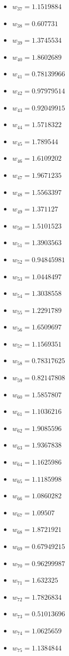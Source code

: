 \documentclass[11pt]{article}
\begin{document}
\begin{itemize}
\item $w_{37} = 1.1519884$
\item $w_{38} = 0.607731$
\item $w_{39} = 1.3745534$
\item $w_{40} = 1.8602689$
\item $w_{41} = 0.78139966$
\item $w_{42} = 0.97979514$
\item $w_{43} = 0.92049915$
\item $w_{44} = 1.5718322$
\item $w_{45} = 1.789544$
\item $w_{46} = 1.6109202$
\item $w_{47} = 1.9671235$
\item $w_{48} = 1.5563397$
\item $w_{49} = 1.371127$
\item $w_{50} = 1.5101523$
\item $w_{51} = 1.3903563$
\item $w_{52} = 0.94845981$
\item $w_{53} = 1.0448497$
\item $w_{54} = 1.3038558$
\item $w_{55} = 1.2291789$
\item $w_{56} = 1.6509697$
\item $w_{57} = 1.1569351$
\item $w_{58} = 0.78317625$
\item $w_{59} = 0.82147808$
\item $w_{60} = 1.5857807$
\item $w_{61} = 1.1036216$
\item $w_{62} = 1.9085596$
\item $w_{63} = 1.9367838$
\item $w_{64} = 1.1625986$
\item $w_{65} = 1.1185998$
\item $w_{66} = 1.0860282$
\item $w_{67} = 1.09507$
\item $w_{68} = 1.8721921$
\item $w_{69} = 0.67949215$
\item $w_{70} = 0.96299987$
\item $w_{71} = 1.632325$
\item $w_{72} = 1.7826834$
\item $w_{73} = 0.51013696$
\item $w_{74} = 1.0625659$
\item $w_{75} = 1.1384844$

\end{itemize}
\end{document}
